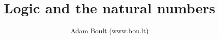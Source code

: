 \documentclass[oneside]{book}
\begin{document}
\author{Adam Boult (www.bou.lt)}
\title{Logic and the natural numbers}
\maketitle

\setcounter{tocdepth}{0}
\tableofcontents


\end{document}
